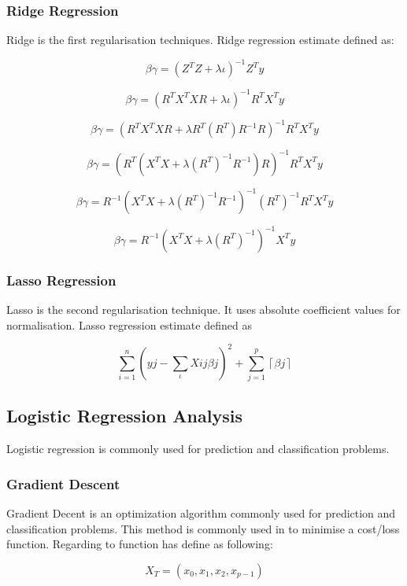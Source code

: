 \begin{Methods}
\subsubsection{Ridge Regression}
Ridge is the first regularisation techniques. Ridge regression estimate defined as:

\[
\beta\gamma =\left( Z^{T}Z+\lambda\iota \right)^{-1}Z^{T}y
\]

\[
\beta\gamma =\left( R^{T}X^{T}X R+\lambda\iota \right)^{-1}R^{T}X^{T}y
\]

\[
\beta\gamma =\left( R^{T}X^{T}X R+\lambda R^{T}\left(R^{T}  \right)R^{-1}R\right)^{-1}R^{T}X^{T}y
\]

\[
\beta\gamma =\left( R^{T}\left( X^{T}X+\lambda\left( R^{T} \right)^{-1}R^{-1} \right)R \right)^{-1}R^{T}X^{T}y
\]

\[
\beta\gamma =R^{-1}\left(X^{T} X + \lambda\left( R^{T} \right)^{-1} R^{-1} \right)^{-1}\left( R^{T} \right)^{-1}R^{T}X^{T}y
\]

\[
\beta\gamma =R^{-1}\left( X^{T} X + \lambda\left( R^{T} \right)^{-1} \right)^{-1}X^{T}y
\]

\subsubsection{Lasso Regression}
Lasso is the second regularisation technique. It uses absolute coefficient values for normalisation. Lasso regression estimate defined as

\[
\sum_{i=1}^{n} \left( yj-\sum_{\iota}^{} Xij \beta j \right)^{2} +\sum_{j=1}^{p}\left\lceil \beta j \right\rceil
\]

\subsection{Logistic Regression Analysis}
Logistic regression is commonly used for prediction and classification problems. 



\subsubsection{Gradient Descent}
Gradient Decent is an optimization algorithm commonly used for prediction and classification problems. This method is commonly used in to minimise a cost/loss function. Regarding to function has define as following:

\[
X_{T}= (x_{0}, x_{1}, x_{2}, x_{p-1})
\]


\end{Methods}
